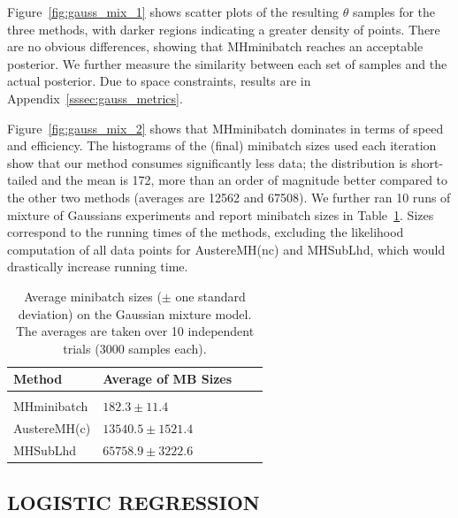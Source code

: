\documentclass[letterpaper]{article}
\begin{document}
Figure~\ref{fig:gauss_mix_1} shows scatter plots of the resulting $\theta$
samples for the three methods, with darker regions indicating a greater density
of points. There are no obvious differences, showing that {\sc MHminibatch}
reaches an acceptable posterior. We further measure the similarity between each
set of samples and the actual posterior. Due to space constraints, results are
in Appendix~\ref{sssec:gauss_metrics}.

Figure~\ref{fig:gauss_mix_2} shows that {\sc MHminibatch} dominates in terms of
speed and efficiency. The histograms of the (final) minibatch sizes used each
iteration show that our method consumes significantly less data; the
distribution is short-tailed and the mean is 172, more than an order of
magnitude better compared to the other two methods (averages are 12562 and
67508). We further ran 10 runs of mixture of Gaussians experiments and report
minibatch sizes in Table~\ref{tab:gaussianres}. Sizes correspond to the running
times of the methods, excluding the likelihood computation of all data points
for {\sc AustereMH(nc)} and {\sc MHSubLhd}, which would drastically increase
    running time.


\begin{table}[t]
\caption{Average minibatch sizes ($\pm$ one standard deviation) on the Gaussian
mixture model. The averages are taken over 10 independent trials (3000 samples
each).}
\label{tab:gaussianres}
\vskip 0.15in
\begin{center}
\begin{tabular}{l l l l}
\textbf{Method} & \textbf{Average of MB Sizes} \\
\hline \\
{\sc MHminibatch}   & $182.3\pm 11.4$ \\
{\sc AustereMH(c)}  & $13540.5\pm 1521.4$ \\
{\sc MHSubLhd}      & $65758.9\pm 3222.6$ \\
\end{tabular}
\end{center}
\vskip -0.1in
\end{table}


\subsection{LOGISTIC REGRESSION}\label{ssec:logistic}
\end{document}

